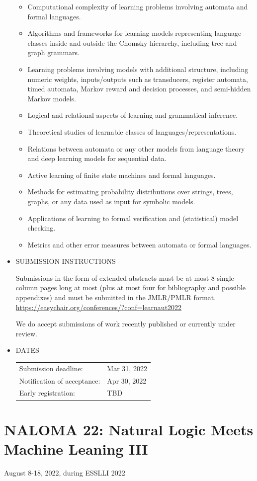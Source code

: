 \documentclass[prodmode,acmtecs]{acmsmall} %
\begin{document}
\begin{itemize}
\begin{itemize}\item  Computational complexity of learning problems involving automata and formal languages.
\item  Algorithms and frameworks for learning models representing language classes inside and outside the Chomsky hierarchy, including tree and graph grammars.
\item  Learning problems involving models with additional structure, including numeric weights, inputs/outputs such as transducers, register automata, timed automata, Markov reward and decision processes, and semi-hidden Markov models.
\item  Logical and relational aspects of learning and grammatical inference.
\item  Theoretical studies of learnable classes of languages/representations.
\item  Relations between automata or any other models from language theory and deep learning models for sequential data.
\item  Active learning of finite state machines and formal languages.
\item  Methods for estimating probability distributions over strings, trees, graphs, or any data used as input for symbolic models.
\item  Applications of learning to formal verification and (statistical) model checking.
\item  Metrics and other error measures between automata or formal languages.
\end{itemize} 
\item  SUBMISSION INSTRUCTIONS 
 
  Submissions in the form of extended abstracts must be at most 8 single-column pages long at most (plus at most four for bibliography and possible appendixes) and must be submitted in the JMLR/PMLR format.  \href{https://easychair.org/conferences/?conf=learnaut2022}{https://easychair.org/conferences/?conf=learnaut2022}   
 
  We do accept submissions of work recently published or currently under review. 
 
\item  DATES 
 
\begin{tabulary}{\linewidth}{LL}Submission deadline:  & Mar 31, 2022 \\
Notification of acceptance:  & Apr 30, 2022 \\
Early registration:  & TBD \\
\end{tabulary}
 
\end{itemize}\section{NALOMA 22:  Natural Logic Meets Machine Leaning III}\label{NALOMA22}  August 8-18, 2022, during ESSLLI 2022\\ 
\end{document}
